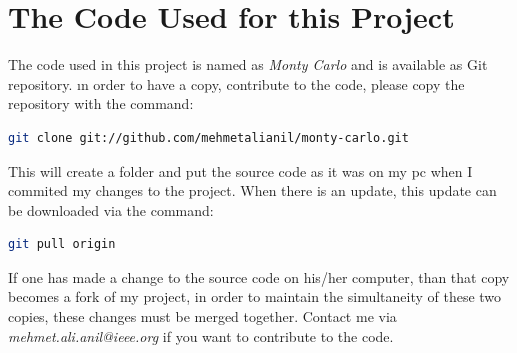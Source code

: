 \section{The Code Used for this Project}

The code used in this project is named as \emph{Monty Carlo} and is available as Git repository. ın order to have a copy, contribute to the code, please copy the repository with the command:

\begin{lstlisting}[language=bash]
git clone git://github.com/mehmetalianil/monty-carlo.git
\end{lstlisting} 

This will create a folder and put the source code as it was on my pc when I commited my changes to the project. When there is an update, this update can be downloaded via the command:

\begin{lstlisting}[language=bash]
git pull origin
\end{lstlisting}

If one has made a change to the source code on his/her computer, than that copy becomes a fork of my project, in order to maintain the simultaneity of these two copies, these changes must be merged together. Contact me via \emph{mehmet.ali.anil@ieee.org} if you want to contribute to the code. 
